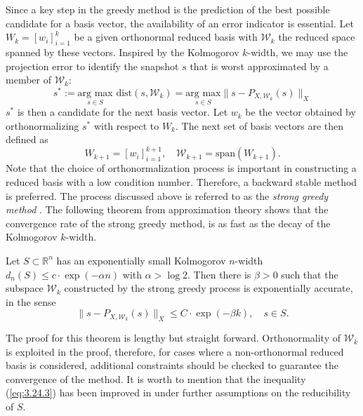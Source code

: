 Since a key step in the greedy method is the prediction of the best possible candidate for a basis vector, the availability of an error indicator is essential. Let $W_k = [ w_i ]_{i=1}^k$ be a given orthonormal reduced basis with $\mathcal W_k$ the reduced space spanned by these vectors. Inspired by the Kolmogorov $k$-width, we may use the projection error to identify the snapshot $s$ that is worst approximated by a member of $\mathcal W_k$:
\begin{equation} \label{eq:3.24.1}
	s^* := \underset{s\in S}{\text{arg\ max} } \text{\ dist}(s,\mathcal W_k)
= \underset{s\in S}{\text{arg\ max} } \| s - P_{X,\mathcal W_k}(s) \|_X \end{equation}
$s^*$ is then a candidate for the next basis vector. Let $w_k$ be the vector obtained by orthonormalizing $s^*$ with respect to $W_k$. The next set of basis vectors are then defined as
\begin{equation} \label{eq:3.24.2}
	W_{k+1} = [w_i]_{i=1}^{k+1}, \quad \mathcal W_{k+1} = \text{span}(W_{k+1}). 
\end{equation}
Note that the choice of orthonormalization process is important in constructing a reduced basis with a low condition number. Therefore, a backward stable method is preferred. The process discussed above is referred to as the \emph{strong greedy method} \cite{quarteroni2015reduced}. The following theorem from approximation theory shows that the convergence rate of the strong greedy method, is as fast as the decay of the Kolmogorov $k$-width. 
\begin{theorem}
	\cite{doi:10.1137/100795772} Let $S\subset \mathbb R^{n}$ has an exponentially small Kolmogorov $n$-width $d_n(S) \leq c\cdot \exp(-\alpha n)$ with $\alpha > \log 2$. Then there is $\beta > 0$ such that the subspace $\mathcal W_k$ constructed by the strong greedy process is exponentially accurate, in the sense
\begin{equation} \label{eq:3.24.3}
	\| s - P_{X,\mathcal W_k}(s) \|_X \leq C\cdot \exp(-\beta k), \quad s \in S.
\end{equation}
\end{theorem}
The proof for this theorem is lengthy but straight forward. Orthonormality of $\mathcal W_k$ is exploited in the proof, therefore, for cases where a non-orthonormal reduced basis is considered, additional constraints should be checked to guarantee the convergence of the method. It is worth to mention that the inequality (\ref{eq:3.24.3}) has been improved in \cite{buffa2012priori} under further assumptions on the reducibility of $S$. 

